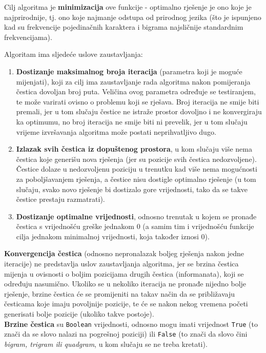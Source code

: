 \documentclass[12pt, a4paper]{article}
\begin{document}
Cilj algoritma je \textbf{minimizacija} ove funkcije - optimalno rješenje je ono koje je najprirodnije, tj. ono koje najmanje odstupa od prirodnog jezika (što je ispunjeno kad su frekvencije pojedinačnih karaktera i bigrama najsličnije standardnim frekvencijama).

Algoritam ima sljedeće uslove zaustavljanja:

\begin{enumerate}

\item \textbf{Dostizanje maksimalnog broja iteracija} (parametra koji je moguće mijenjati), koji za cilj ima zaustavljanje rada algoritma nakon pomijeranja čestica dovoljan broj puta. Veličina ovog parametra određuje se testiranjem, te može varirati ovisno o problemu koji se rješava. Broj iteracija ne smije biti premali, jer u tom slučaju čestice ne istraže prostor dovoljno i ne konvergiraju ka optimumu, no broj iteracija ne smije biti ni prevelik, jer u tom slučaju vrijeme izvršavanja algoritma može postati neprihvatljivo dugo.
\item \textbf{Izlazak svih čestica iz dopuštenog prostora}, u kom slučaju više nema čestica koje generišu nova rješenja (jer su pozicije svih čestica nedozvoljene). Čestice dolaze u nedozvoljenu poziciju u trenutku kad više nema mogućnosti za poboljšavanjem rješenja, a čestice nisu dostigle optimalno rješenje (u tom slučaju, svako novo rješenje bi dostizalo gore vrijednosti, tako da se takve čestice prestaju razmatrati).
\item \textbf{Dostizanje optimalne vrijednosti}, odnosno trenutak u kojem se pronađe čestica s vrijednošću greške jednakom 0 (a samim tim i vrijednošću funkcije cilja jednakom minimalnoj vrijednosti, koja također iznosi 0).

\end{enumerate}

\textbf{Konvergencija čestica} (odnosno nepronalazak boljeg rješenja nakon jedne iteracije) ne predstavlja uslov zaustavljanja algoritma, jer se brzina čestica mijenja u ovisnosti o boljim pozicijama drugih čestica (informanata), koji se određuju nasumično. Ukoliko se u nekoliko iteracija ne pronađe nijedno bolje rješenje, brzine čestica će se promijeniti na takav način da se približavaju česticama koje imaju povoljnije pozicije, te će se nakon nekog vremena početi generisati bolje pozicije (ukoliko takve postoje). \\

\textbf{Brzine čestica} su \texttt{Boolean} vrijednosti, odnosno mogu imati vrijednost \texttt{True} (to znači da se slovo nalazi na pogrešnoj poziciji) ili \texttt{False} (to znači da slovo čini \textit{bigram, trigram ili quadgram}, u kom slučaju se ne treba kretati). \\
\end{document}
